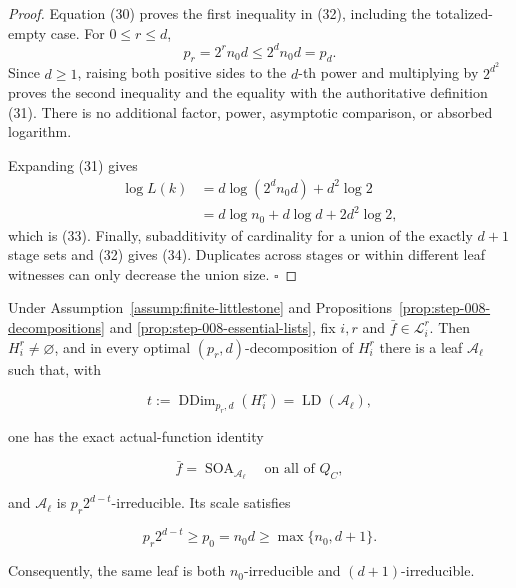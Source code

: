 \begin{proof}
Equation (30) proves the first inequality in (32), including the
totalized-empty case. For \(0\le r\le d\),
\[
 p_r=2^rn_0d\le2^dn_0d=p_d.
\]
Since \(d\ge1\), raising both positive sides to the \(d\)-th power and
multiplying by \(2^{d^2}\) proves the second inequality and the equality
with the authoritative definition (31). There is no additional factor,
power, asymptotic comparison, or absorbed logarithm.

Expanding (31) gives
\[
\begin{aligned}
 \log L(k)
 &=d\log(2^dn_0d)+d^2\log2\\
 &=d\log n_0+d\log d+2d^2\log2,
\end{aligned}
\]
which is (33). Finally, subadditivity of cardinality for a union of the
exactly \(d+1\) stage sets and (32) gives (34). Duplicates across stages
or within different leaf witnesses can only decrease the union size.
\(\square\)


\end{proof}

\begin{proposition}\label{prop:step-008-leaf-scale}
Under Assumption~\ref{assump:finite-littlestone} and
Propositions~\ref{prop:step-008-decompositions} and
\ref{prop:step-008-essential-lists}, fix \(i,r\) and
\(\bar f\in\mathcal L_i^r\). Then \(H_i^r\ne\varnothing\), and in every
optimal \((p_r,d)\)-decomposition of \(H_i^r\) there is a leaf
\(\mathcal A_\ell\) such that, with

\[
 t:=\operatorname{DDim}_{p_r,d}(H_i^r)
   =\operatorname{LD}(\mathcal A_\ell),
\tag{35}
\]

one has the exact actual-function identity

\[
 \bar f=\operatorname{SOA}_{\mathcal A_\ell}
 \quad\text{on all of }Q_C,
\tag{36}
\]

and \(\mathcal A_\ell\) is
\(p_r2^{d-t}\)-irreducible. Its scale satisfies

\[
 p_r2^{d-t}\ge p_0=n_0d\ge\max\{n_0,d+1\}.
\tag{37}
\]

Consequently, the same leaf is both \(n_0\)-irreducible and
\((d+1)\)-irreducible.


\end{proposition}

